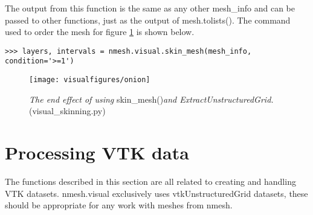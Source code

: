The output from this function is the same as any other {\ttfamily mesh\_info} and can be passed to other functions, just as the output of {\ttfamily mesh.tolists()}. The command used to order the mesh for figure \ref{fig:onion} is shown below.
\begin{lstlisting}[basicstyle=\small\ttfamily]
>>> layers, intervals = nmesh.visual.skin_mesh(mesh_info, condition='>=1')
\end{lstlisting}



\newpage
\begin{landscape}
\begin{figure}
\begin{center}
\texttt{[image: visualfigures/onion]}
\caption{{\em The end effect of using }{\ttfamily skin\_mesh()}{\em and ExtractUnstructuredGrid. }(visual\_skinning.py) \label{fig:onion}}
\end{center}
\end{figure}
\end{landscape}



\section{Processing VTK data}
The functions described in this section are all related to creating and handling VTK datasets. {\ttfamily nmesh.visual} exclusively uses vtkUnstructuredGrid datasets, these should be appropriate for any work with meshes from {\ttfamily nmesh}. 

